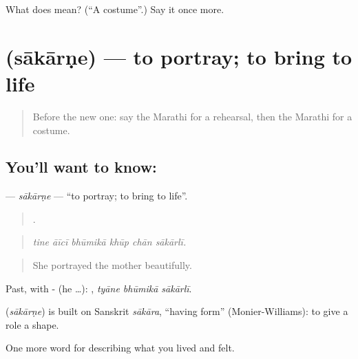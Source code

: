 \begin{tcolorbox}[breakable,colback=teal!4,colframe=teal!35!black,title={Before you move on}]
What does  mean? (\textquotedblleft{}A costume\textquotedblright{}.) Say it once more.
\end{tcolorbox}
\section[\texorpdfstring{\mr{साकारणे} (sākārṇe)}{साकारणे (sākārṇe)}]{ (sākārṇe) — to portray; to bring to life}

\label{lesson:MR-C537-sakarne}



\begin{quote}
Before the new one: say the Marathi for a rehearsal, then the Marathi for a costume.
\end{quote}

\subsection*{You'll want to know: }
\textbf{} — \emph{sākārṇe} — \textquotedblleft{}to portray; to bring to life\textquotedblright{}.

\begin{quote}
     .
\end{quote}

\begin{quote}
\emph{tine āīcī bhūmikā khūp chān sākārlī.}
\end{quote}

\begin{quote}
She portrayed the mother beautifully.
\end{quote}

Past, with - (he …):   , \emph{tyāne bhūmikā sākārlī}.

\begin{cousinweb}
\textbf{} (\emph{sākārṇe}) is built on Sanskrit \emph{sākāra}, \textquotedblleft{}having form\textquotedblright{} (Monier-Williams): to give a role a shape.
\end{cousinweb}

\begin{grammarlens}[title={What you've built}]
One more word for describing what you lived and felt.
\end{grammarlens}

